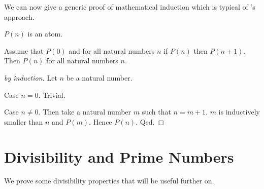 \documentclass{article}
\begin{document}
We can now give a generic proof of mathematical induction which
is typical of \Naproche's approach.
\begin{forthel}
\begin{signature}
$P(n)$ is an atom.
\end{signature}

\begin{theorem}
Assume that $P(0)$ and for all natural numbers
$n$ if $P(n)$ then  $P(n+1)$.
Then $P(n)$ for all natural numbers $n$.
\end{theorem}
\begin{proof}[by induction]
Let $n$ be a natural number.

Case $n = 0$. Trivial.

Case $n \neq 0$. Then take a natural number $m$ such that
$n = m + 1$. $m$ is inductively smaller than $n$ and $P(m)$. 
Hence $P(n)$.
Qed.
\end{proof}
\end{forthel}


\section{Divisibility and Prime Numbers}


We prove some divisibility properties that will be useful
further on.
\end{document}
